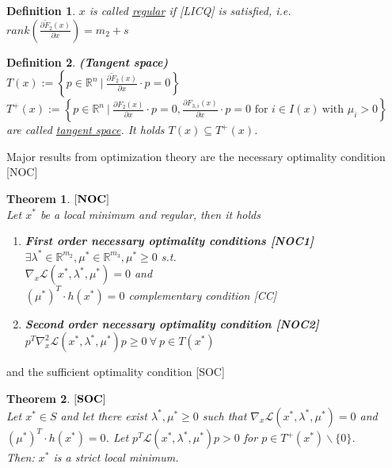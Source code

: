 \documentclass{scrartcl}[12pt, halfparskip]
\numberwithin{equation}{section}
\numberwithin{figure}{section}
\numberwithin{table}{section}
\newtheorem{Definition}{Definition}
\newtheorem{Theorem}{Theorem}
\begin{document}
\begin{Definition}
	$x$ is called \underline{regular} if [LICQ] is satisfied, i.e. $rank \left( \frac{\partial \tilde F_2(x)}{\partial x} \right) = m_2 + s$
\end{Definition}

\begin{Definition}
	\textbf{(Tangent space)} \\
	$T(x) := \left\{ p \in \mathbb{R}^n \ | \ \frac{\partial \tilde F_2(x)}{\partial x} \cdot p = 0 \right\}$ \\
	$T^+(x) := \left\{ p \in \mathbb{R}^n \ | \ \frac{\partial F_2(x)}{\partial x} \cdot p = 0, \frac{\partial F_{3,i}(x)}{\partial x} \cdot p = 0 \text{ for } i \in I(x) \ \text{with } \mu_i > 0 \right\}$ \\
	are called \underline{tangent space}. It holds $T(x) \subseteq T^+(x)$.
\end{Definition}

Major results from optimization theory are the necessary optimality condition [NOC]

\begin{Theorem}
	$[\text{\textbf{NOC}}]$ \\
	Let $x^*$ be a local minimum and regular, then it holds
	\begin{enumerate}
		\item \textbf{First order necessary optimality conditions [NOC1]} \\
		$\exists \lambda^* \in \mathbb{R}^{m_2}, \mu^* \in \mathbb{R}^{m_3}, \mu^* \ge 0$ s.t. \\
		$\nabla_x \mathcal{L}(x^*, \lambda^*, \mu^*) = 0$ and \\
		$(\mu^*)^T \cdot h(x^*) = 0$ complementary condition [CC]
		\item \textbf{Second order necessary optimality condition [NOC2]} \\
		$p^T \nabla_x^2 \mathcal{L}(x^*, \lambda^*, \mu^*) p \ge 0 \ \forall \ p \in T(x^*)$
	\end{enumerate}
\end{Theorem}

and the sufficient optimality condition [SOC]

\begin{Theorem}
	$[\text{\textbf{SOC}}]$ \\
	Let $x^* \in S$ and let there exist $\lambda^*, \mu^* \ge 0$ such that $\nabla_x \mathcal{L}(x^*, \lambda^*, \mu^*) = 0$ and \\ $(\mu^*)^T \cdot h(x^*) = 0$. 
	Let $p^T \mathcal{L}(x^*, \lambda^*, \mu^*) p > 0$ for $p \in T^+(x^*) \backslash \{0\}$. \\
	Then: $x^*$ is a strict local minimum.
\end{Theorem}
\end{document}
